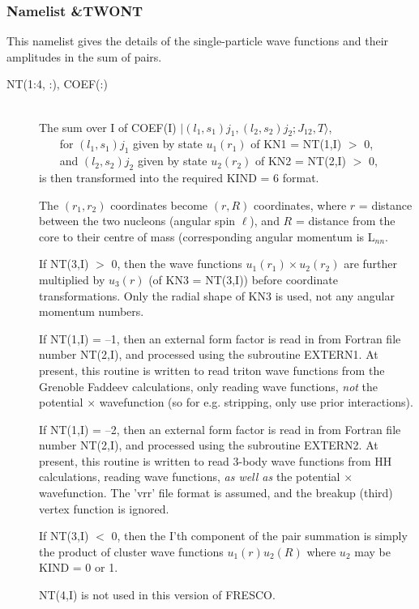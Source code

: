 \documentclass[11pt]{article}
\begin{document}
\subsubsection{Namelist \&TWONT}
This namelist gives the details of the single-particle wave functions and their amplitudes in the sum of pairs.
%
\begin{description}
\item[NT(1:4, :), COEF(:)] ~\\
The sum over I of  COEF(I) $| (l_1,s_1)j_1, (l_2,s_2)j_2 ; J_{12},T \rangle$,
\\
 \mbox{~~~} for  $(l_1,s_1)j_1$  given by state $u_1(r_1)$ of KN1 = NT(1,I) $>$ 0,
\\
 \mbox{~~~}    and  $(l_2,s_2)j_2$  given by state $u_2(r_2)$ of KN2 = NT(2,I) $>$ 0,
\\
is then transformed into the required KIND = 6 format.

The $(r_1,r_2)$ coordinates become $(r,R)$ coordinates,
where
$r$ = distance between the two nucleons (angular spin $\ell$), and
$R$ = distance from the core to their centre of mass
     (corresponding angular momentum is L$_{nn}$.

If NT(3,I) $>$ 0, then the wave functions $u_1(r_1)\times u_2(r_2)$ are further
multiplied by $u_3(r)$ (of KN3 = NT(3,I)) before coordinate transformations.
Only the radial shape of KN3 is used, not any angular momentum numbers.

If NT(1,I) = --1, then an external form factor is read in from Fortran file
number NT(2,I), and processed using the subroutine EXTERN1.
At present, this routine is written to read triton wave functions
from the Grenoble Faddeev calculations,
only reading wave functions, {\em not} the potential $\times$
wavefunction (so for e.g. stripping, only use prior interactions).

If NT(1,I) = --2, then an external form factor is read in from Fortran file
number NT(2,I), and processed using the subroutine EXTERN2.
At present, this routine is written to read 3-body wave functions
from HH calculations, reading wave functions, {\em as well as} the
potential $\times$ wavefunction. The 'vrr' file format is assumed,
and the breakup (third) vertex function  is ignored.

If NT(3,I) $<$ 0, then the I'th component of the pair summation is simply
the product of cluster wave functions $u_1(r)  u_2(R) $
where $u_{2}$ may be KIND = 0 or 1.

NT(4,I) is not used in this version of FRESCO.
\end{description}
\end{document}
